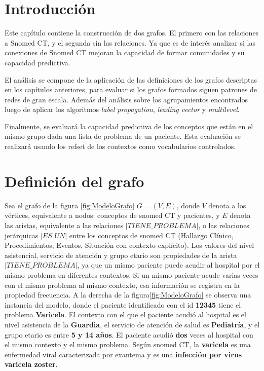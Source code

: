 \section{Introducción}
Este capítulo contiene la construcción de dos grafos. El primero con las relaciones a Snomed CT, y el segunda sin las relaciones. Ya que es de interés analizar si las conexiones de Snomed CT mejoran la capacidad de formar comunidades y su capacidad predictiva.

El análisis se compone de la aplicación de las definiciones de los grafos descriptas en los capítulos anteriores, para evaluar si los grafos formados siguen patrones de redes de gran escala. Además del análisis sobre los agrupamientos encontrados luego de aplicar los algoritmos \textit{label propagation}, \textit{leading vector} y \textit{multilevel}. 

Finalmente, se evaluará la capacidad predictiva de los conceptos que están en el mismo grupo dada una lista de problema de un paciente. Esta evaluación se realizará usando los {\acrshort{refset}} de los contextos como vocabularios controlados.

\section{Definición del grafo}
Sea el grafo de la figura \ref{fig:ModeloGrafo} $G=(V,E)$, donde $V$ denota a los vértices, equivalente a nodos: conceptos de snomed CT y pacientes, y $E$ denota las aristas, equivalente a las relaciones $|\textit{TIENE\_PROBLEMA}|$, o las relaciones jerárquicas $|\textit{ES\_UN}|$ entre los conceptos de snomed CT (Hallazgo Clínico, Procedimientos, Eventos, Situación con contexto explícito). Los valores del nivel asistencial, servicio de atención  y grupo etario son propiedades de la arista $|\textit{TIENE\_PROBLEMA}|$, ya que un mismo paciente puede acudir al hospital por el mismo problema en diferentes contextos.  Si un mismo paciente acude varias veces con el mismo problema al mismo contexto, esa información se registra en la propiedad frecuencia. A la derecha de la figura\ref{fig:ModeloGrafo} se observa una instancia del modelo, donde el paciente identificado con el id \textbf{12345} tiene el problema \textbf{Varicela}. El contexto con el que el paciente acudió al hospital es el nivel asistencia de la \textbf{Guardia}, el servicio de atención de salud es \textbf{Pediatría}, y el grupo etario es entre \textbf{5 y 14 años}. El paciente acudió \textbf{dos} veces al hospital con el mismo contexto y el mismo problema. Según snomed CT, la \textbf{varicela} es una {enfermedad viral caracterizada por exantema} y es una \textbf{infección por virus varicela zoster}.

